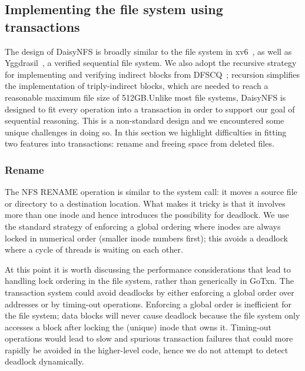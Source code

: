 \subsection{Implementing the file system using transactions}

The design of DaisyNFS is broadly similar to the file system in xv6~\cite{xv6},
as well as Yggdrasil~\cite{sigurbjarnarson:yggdrasil}, a verified sequential
file system. We also adopt the recursive strategy for implementing and
verifying indirect blocks from DFSCQ~\cite{akonradi-meng}; recursion simplifies
the implementation of triply-indirect blocks, which are needed to reach a
reasonable maximum file size of 512GB.\@ Unlike most file systems, DaisyNFS is designed
to fit every operation into a transaction in order to support our goal of
sequential reasoning. This is a non-standard design and we encountered some
unique challenges in doing so. In this section we highlight difficulties in
fitting two features into transactions: rename and freeing space from deleted
files.

\subsubsection{Rename}
\label{sec:dafny:rename}

The NFS RENAME operation is similar to the  system call: it moves a
source file or directory to a destination location. What makes it tricky is that
it involves more than one inode and hence introduces the possibility for
deadlock.
We
use the standard strategy of enforcing a global ordering where inodes are always
locked in numerical order (smaller inode numbers first); this avoids a deadlock
where a cycle of threads is waiting on each other.

At this point it is worth discussing the performance considerations that lead to
handling lock ordering in the file
system, rather than generically in GoTxn. The transaction system could
avoid deadlocks by either enforcing a global order over addresses or by
timing-out operations. Enforcing a global order is inefficient for the file
system; data blocks will never cause deadlock because the file system only
accesses a block after locking the (unique) inode that owns it. Timing-out
operations would lead to slow and spurious transaction failures that could more
rapidly be avoided in the higher-level code, hence we do not attempt to detect
deadlock dynamically.

